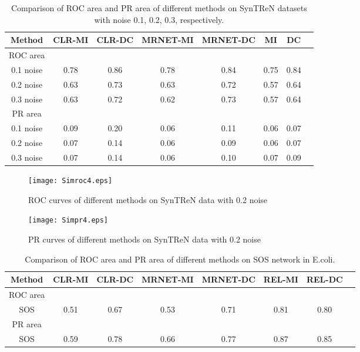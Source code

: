 \documentclass{bioinfo}
\begin{document}
\begin{table}[0.5\textwidth] \tiny
\centering \caption{Comparison of ROC area and PR area of different
methods on SynTReN datasets with noise 0.1, 0.2, 0.3, respectively.}\label{noisy-roc-pr}
\begin{tabular}{cccccccc}
 \hline
 Method & CLR-MI & CLR-DC & MRNET-MI & MRNET-DC & MI & DC \\
 \hline
  ROC area\\
 0.1 noise & 0.78 & 0.86 & 0.78 & 0.84 & 0.75 & 0.84  \\
 0.2 noise & 0.63 & 0.73 & 0.63 & 0.72 & 0.57 & 0.64 \\
 0.3 noise & 0.63 & 0.72 & 0.62 & 0.73 & 0.57 & 0.64 \\
 PR area\\
 0.1 noise & 0.09 & 0.20 & 0.06 & 0.11 & 0.06 & 0.07  \\
 0.2 noise & 0.07 & 0.14 & 0.06 & 0.09 & 0.06 & 0.07  \\
 0.3 noise & 0.07 & 0.14 & 0.06 & 0.10 & 0.07 & 0.09 \\
  \hline
\end{tabular}
\end{table}


 \begin{figure}[!h]
  \texttt{[image: Simroc4.eps]}
  \caption{ROC curves of different methods on SynTReN data with 0.2 noise}\label{noisy-roc}
\end{figure}

\begin{figure}[!h]
  \texttt{[image: Simpr4.eps]}
  \caption{PR curves of different methods on SynTReN data with 0.2 noise}\label{noisy-pr}
\end{figure}



\begin{table}[0.5\textwidth] \tiny
\centering \caption{Comparison of ROC area and PR area of different methods on SOS network in E.coli.}\label{sos-roc-pr}
\begin{tabular}{cccccccc}
 \hline
 Method & CLR-MI & CLR-DC & MRNET-MI & MRNET-DC & REL-MI & REL-DC \\
 \hline
  ROC area\\
  SOS     & 0.51 & 0.67 & 0.53 & 0.71 & 0.81 & 0.80 \\
 PR area\\
  SOS   & 0.59 &0.78 & 0.66 & 0.77 & 0.87 & 0.85 \\
  \hline
\end{tabular}
\end{table}
\end{document}
